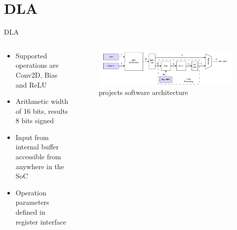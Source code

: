 \section{DLA}
\begin{frame}{DLA}
    \begin{columns}

        \begin{column}{0.4\textwidth}
          \begin{itemize}
                  \item Supported operations are Conv2D, Bias and ReLU
                  \item Arithmetic width of 16 bits, results 8 bits signed
                  \item Input from internal buffer accessible from anywhere in the SoC
                  \item Operation parameters defined in register interface
          \end{itemize}
        \end{column}

        \begin{column}{0.6\textwidth}
            \begin{figure}
                \vfill
                \includegraphics[width=1.0\textwidth]{../../thesis/img/dla-internal.pdf}
                \caption{projects software architecture}
            \end{figure}
        \end{column}
    \end{columns}
\end{frame}

